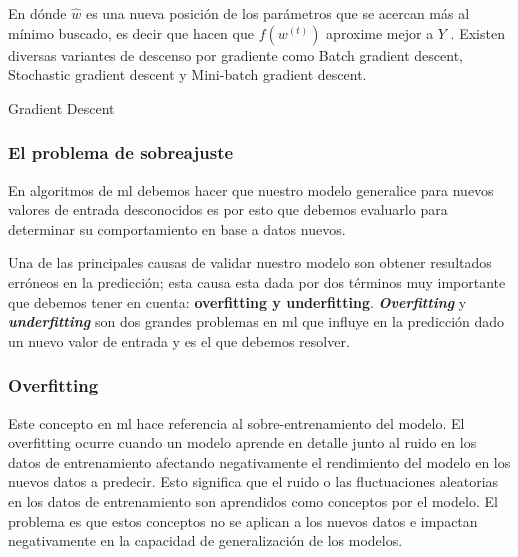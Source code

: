 En dónde $\hat{w}$ es una nueva posición de los parámetros que se acercan más al mínimo buscado, es decir que hacen que $f(w^{(t)})$ aproxime mejor a $Y$ . Existen diversas variantes de descenso por gradiente como Batch gradient descent, Stochastic gradient descent y Mini-batch gradient descent.


\begin{algorithm}
\caption{Gradient Descent}\label{euclid}
\begin{algorithmic}[1]

\State $\textbf{INPUT} \gets (X, Y, \theta,iteraciones, \alpha)$
\State $\textbf{OUTPUT} \gets \theta $
\State \textbf{i} = 0
\While {\textbf{i} <  iteraciones}{
\State i++
\State	error = \textit{FunciónCosto}(X, Y, \theta)

\If {error < minerror}
	\State	break
\Else
	\State \texttt{\theta_{j} := \theta_{j} - \alpha \frac{\partial}{\partial \theta} J(\theta_{1}, \theta_{0})}
	
\EndIf
\EndWhile
\end{algorithmic}
\end{algorithm}



\subsubsection{El problema de sobreajuste}\label{sub:validacion-modelo}

En algoritmos de \ac{ml} debemos hacer que nuestro modelo generalice para nuevos valores de entrada desconocidos es por esto que debemos evaluarlo para determinar su comportamiento en base a datos nuevos. 

Una de las principales causas de validar nuestro modelo son obtener resultados erróneos en la predicción; esta causa esta dada por dos términos muy importante que debemos tener en cuenta: \textbf{overfitting y underfitting}. \textit{\textbf{Overfitting}} y \textit{\textbf{underfitting}} son dos grandes problemas en \ac{ml} que influye en la predicción dado un nuevo valor de entrada y es el que debemos resolver. 

\subsubsection*{Overfitting}
Este concepto en \ac{ml} hace referencia al sobre-entrenamiento del modelo. El overfitting ocurre cuando un modelo aprende en detalle junto al ruido en los datos de entrenamiento afectando negativamente el rendimiento del modelo en los nuevos datos a predecir. Esto significa que el ruido o las fluctuaciones aleatorias en los datos de entrenamiento son aprendidos como conceptos por el modelo. El problema es que estos conceptos no se aplican a los nuevos datos e impactan negativamente en la capacidad de generalización de los modelos.

